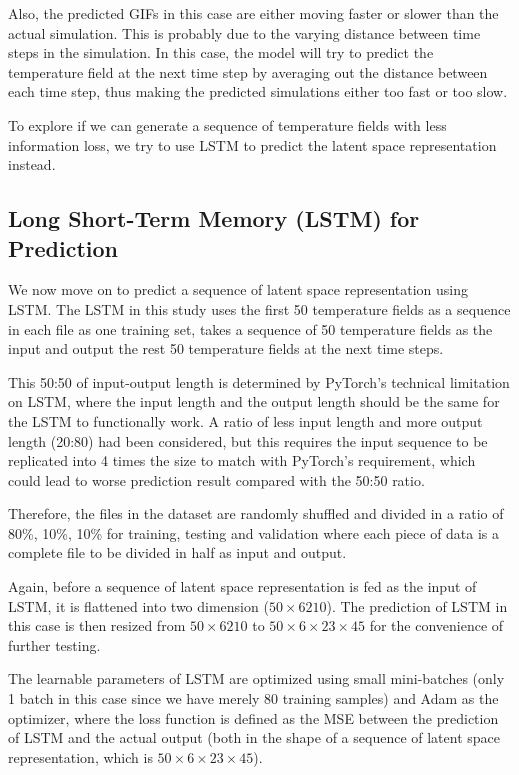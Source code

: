 Also, the predicted GIFs in this case are either moving faster or slower than the actual simulation. This is probably due to the varying distance between time steps in the simulation. In this case, the model will try to predict the temperature field at the next time step by averaging out the distance between each time step, thus making the predicted simulations either too fast or too slow.

To explore if we can generate a sequence of temperature fields with less information loss, we try to use LSTM to predict the latent space representation instead.


\subsection{Long Short-Term Memory (LSTM) for Prediction}

We now move on to predict a sequence of latent space representation using LSTM. The LSTM in this study uses the first 50 temperature fields as a sequence in each file as one training set, takes a sequence of 50 temperature fields as the input and output the rest 50 temperature fields at the next time steps.

This 50:50 of input-output length is determined by PyTorch's technical limitation on LSTM, where the input length and the output length should be the same for the LSTM to functionally work. A ratio of less input length and more output length (20:80) had been considered, but this requires the input sequence to be replicated into 4 times the size to match with PyTorch's requirement, which could lead to worse prediction result compared with the 50:50 ratio.

Therefore, the files in the dataset are randomly shuffled and divided in a ratio of 80\%, 10\%, 10\% for training, testing and validation where each piece of data is a complete file to be divided in half as input and output.

Again, before a sequence of latent space representation is fed as the input of LSTM, it is flattened into two dimension ($50 \times 6210$). The prediction of LSTM in this case is then resized from $50 \times 6210$ to $50 \times 6 \times 23 \times 45$ for the convenience of further testing.

The learnable parameters of LSTM are optimized using small mini-batches (only 1 batch in this case since we have merely 80 training samples) and Adam as the optimizer, where the loss function is defined as the MSE between the prediction of LSTM and the actual output (both in the shape of a sequence of latent space representation, which is $50 \times 6 \times 23 \times 45$).

